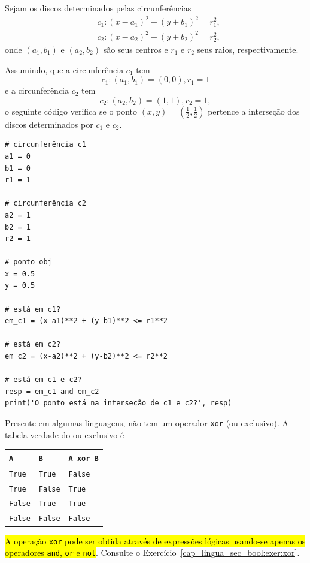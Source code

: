 \begin{ex}
  Sejam os discos determinados pelas circunferências
  \begin{align}
    & c_1: (x - a_1)^2 + (y + b_1)^2 = r_1^2, \\
    & c_2: (x - a_2)^2 + (y + b_2)^2 = r_2^2,
  \end{align}
  onde $(a_1, b_1)$ e $(a_2, b_2)$ são seus centros e $r_1$ e $r_2$ seus raios, respectivamente.

  Assumindo, que a circunferência $c_1$ tem
  \begin{equation}
    c_1: (a_1, b_1) = (0, 0), r_1 = 1
  \end{equation}
  e a circunferência $c_2$ tem
  \begin{equation}
    c_2: (a_2, b_2) = (1, 1), r_2 = 1,
  \end{equation}
  o seguinte código verifica se o ponto $(x, y) = \left(\frac{1}{2}, \frac{1}{2}\right)$ pertence a interseção dos discos determinados por $c_1$ e $c_2$.

\begin{lstlisting}
# circunferência c1
a1 = 0
b1 = 0
r1 = 1

# circunferência c2
a2 = 1
b2 = 1
r2 = 1

# ponto obj
x = 0.5
y = 0.5

# está em c1?
em_c1 = (x-a1)**2 + (y-b1)**2 <= r1**2

# está em c2?
em_c2 = (x-a2)**2 + (y-b2)**2 <= r2**2

# está em c1 e c2?
resp = em_c1 and em_c2
print('O ponto está na interseção de c1 e c2?', resp)
\end{lstlisting}
\end{ex}

\ifisbook
\vspace{0.5cm}
\fi

\begin{obs}\label{cap_lingua_sec_bool:obs:xor}
  Presente em algumas linguagens, {\python} não tem um operador \lstinline+xor+ (ou exclusivo). A tabela verdade do ou exclusivo é
  \begin{center}
    \begin{tabular}[H]{ll|l}
      {\texttt{A}}     & {\texttt{B}}     & {\lstinline+A xor B+} \\\hline
      {\texttt{True}}  & {\texttt{True}}  & {\texttt{False}}   \\
      {\texttt{True}}  & {\texttt{False}} & {\texttt{True}}    \\
      {\texttt{False}} & {\texttt{True}}  & {\texttt{True}}    \\
      {\texttt{False}} & {\texttt{False}} & {\texttt{False}}   \\\hline    
    \end{tabular}
  \end{center}
  \hl{A operação \texttt{xor} pode ser obtida através de expressões lógicas usando-se apenas os operadores \texttt{and}, \texttt{or} e \texttt{not}}. Consulte o Exercício~\ref{cap_lingua_sec_bool:exer:xor}.
\end{obs}

